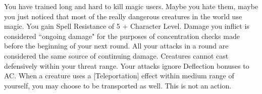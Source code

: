 \combatfeat
{You have trained long and hard to kill magic users. Maybe you hate them, maybe you just noticed that most of the really dangerous creatures in the world use magic.}
{You gain Spell Resistance of 5 + Character Level.}
{Damage you inflict is considered ``ongoing damage" for the purposes of concentration checks made before the beginning of your next round. All your attacks in a round are considered the same source of continuing damage.}
{Creatures cannot cast defensively within your threat range.}
{Your attacks ignore Deflection bonuses to AC.}
{When a creature uses a [Teleportation] effect within medium range of yourself, you may choose to be transported as well. This is not an action.}